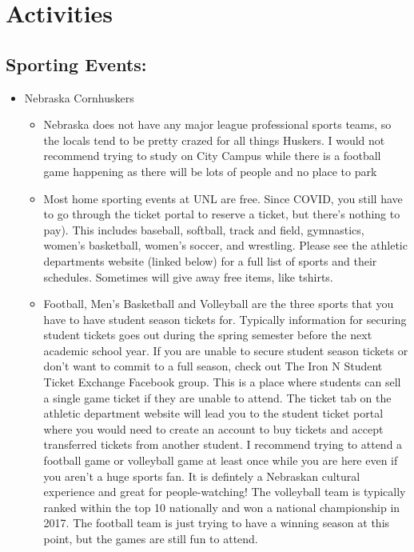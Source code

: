 \documentclass[
  12pt,
]{book}
\begin{document}
\hypertarget{activities}{%
\section{Activities}\label{activities}}

\hypertarget{sporting-events}{%
\subsection{Sporting Events:}\label{sporting-events}}

\begin{itemize}
\item Nebraska Cornhuskers
\begin{itemize}
\item Nebraska does not have any major league professional sports teams, so the locals tend to be pretty crazed for all things Huskers. I would not recommend trying to study on City Campus while there is a football game happening as there will be lots of people and no place to park
\item Most home sporting events at UNL are free. Since COVID, you still have to go through the ticket portal to reserve a ticket, but there's nothing to pay). This includes baseball, softball, track and field, gymnastics, women's basketball, women's soccer, and wrestling. Please see the athletic departments website (linked below) for a full list of sports and their schedules. Sometimes will give away free items, like tshirts. 
\item Football, Men's Basketball and Volleyball are the three sports that you have to have student season tickets for. Typically information for securing student tickets goes out during the spring semester before the next academic school year. If you are unable to secure student season tickets or don't want to commit to a full season, check out The Iron N Student Ticket Exchange Facebook group. This is a place where students can sell a single game ticket if they are unable to attend. The ticket tab on the athletic department website will lead you to the student ticket portal where you would need to create an account to buy tickets and accept transferred tickets from another student. I recommend trying to attend a football game or volleyball game at least once while you are here even if you aren't a huge sports fan. It is defintely a Nebraskan cultural experience and great for people-watching! The volleyball team is typically ranked within the top 10 nationally and won a national championship in 2017. The football team is just trying to have a winning season at this point, but the games are still fun to attend. 

\end{itemize}
\end{itemize}
\end{document}
